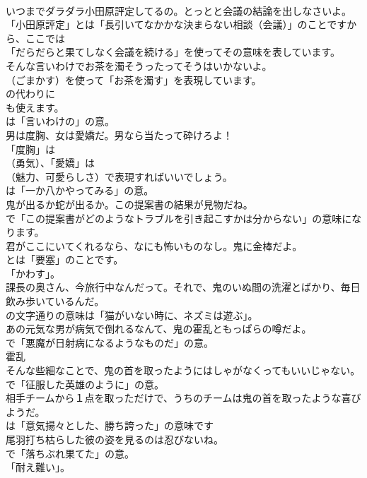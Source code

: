 \documentclass[8pt]{extreport}
\begin{document}
\begin{CJK}{UTF8}{min}
\\	いつまでダラダラ小田原評定してるの。とっとと会議の結論を出しなさいよ。 
\\	「小田原評定」とは「長引いてなかかな決まらない相談（会議）」のことですから、ここでは
\\	「だらだらと果てしなく会議を続ける」を使ってその意味を表しています。	
\\	そんな言いわけでお茶を濁そうったってそうはいかないよ。 
\\	（ごまかす）を使って「お茶を濁す」を表現しています。
\\	の代わりに
\\	も使えます。
\\	は「言いわけの」の意。	
\\	男は度胸、女は愛嬌だ。男なら当たって砕けろよ！ 
\\	「度胸」は 
\\	（勇気）、「愛嬌」は 
\\	（魅力、可愛らしさ）で表現すればいいでしょう。
\\	は「一か八かやってみる」の意。	
\\	鬼が出るか蛇が出るか。この提案書の結果が見物だね。 
\\	で「この提案書がどのようなトラブルを引き起こすかは分からない」の意味になります。	
\\	君がここにいてくれるなら、なにも怖いものなし。鬼に金棒だよ。 
\\	とは「要塞」のことです。
\\	「かわす」。	
\\	課長の奥さん、今旅行中なんだって。それで、鬼のいぬ間の洗濯とばかり、毎日飲み歩いているんだ。 
\\	の文字通りの意味は「猫がいない時に、ネズミは遊ぶ」。	
\\	あの元気な男が病気で倒れるなんて、鬼の霍乱ともっぱらの噂だよ。 
\\	で「悪魔が日射病になるようなものだ」の意。	
\\	霍乱
\\	そんな些細なことで、鬼の首を取ったようにはしゃがなくってもいいじゃない。 
\\	で「征服した英雄のように」の意。	
\\	相手チームから１点を取っただけで、うちのチームは鬼の首を取ったような喜びようだ。 
\\	は「意気揚々とした、勝ち誇った」の意味です	
\\	尾羽打ち枯らした彼の姿を見るのは忍びないね。 
\\	で「落ちぶれ果てた」の意。
\\	「耐え難い」。	

\end{CJK}
\end{document}
